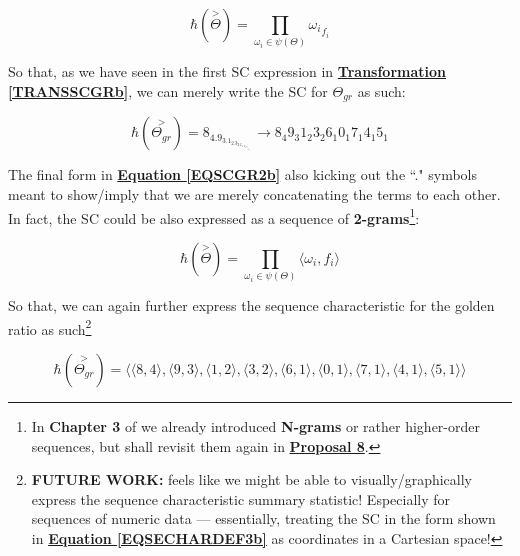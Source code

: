 \documentclass[a4paper, 18pt]{book} %
\begin{document}
\vspace{1em}
\begin{equation}
\label{EQSECHARDEF2b}
 \hbar(\overset{>}{\Theta}) = \prod\limits_{\omega_i \in \psi(\Theta)} {\omega_i}_{f_i}
\end{equation}
\vspace{1em}

So that, as we have seen in the first SC expression in  \textbf{\hyperref[TRANSSCGRb]{Transformation \ref{TRANSSCGRb}}}, we can merely write the SC for $\Theta_{gr}$ as such:

\vspace{1em}
\begin{equation}
\label{EQSCGR2b}
 \hbar(\overset{>}{\Theta_{gr}}) = 8_4.9_3.1_2.3_2.6_1.0_1.7_1.4_1.5_1 \rightarrow 8_4 9_3 1_2 3_2 6_1 0_1 7_1 4_1 5_1
\end{equation}
\vspace{1em}

The final form in \textbf{\hyperref[EQSCGR2b]{Equation \ref{EQSCGR2b}}} also kicking out the ``." symbols meant to show/imply that we are merely concatenating the terms to each other. In fact, the SC could be also expressed as a sequence of \textbf{2-grams}\footnote{In \textbf{Chapter 3} of \cite{lutalo_2025_trans_genetics} we already introduced \textbf{N-grams} or rather higher-order sequences, but shall revisit them again in \textbf{\hyperref[PROP8]{Proposal 8}}.}:

\vspace{1em}
\begin{equation}
\label{EQSECHARDEF3b}
 \hbar(\overset{>}{\Theta}) = \prod\limits_{\omega_i \in \psi(\Theta)} \langle \omega_i, f_i \rangle
\end{equation}
\vspace{1em}

So that, we can again further express the sequence characteristic for the golden ratio as such\footnote{\textbf{FUTURE WORK:} feels like we might be able to visually/graphically express the sequence characteristic summary statistic! Especially for sequences of numeric data --- essentially, treating the SC in the form shown in \textbf{\hyperref[EQSECHARDEF3b]{Equation \ref{EQSECHARDEF3b}}} as coordinates in a Cartesian space!}

\vspace{1em}
\begin{equation}
\label{EQSCGR3b}
 \hbar(\overset{>}{\Theta_{gr}}) = \langle \langle 8, 4 \rangle, \langle 9, 3 \rangle, \langle 1, 2 \rangle, \langle 3, 2 \rangle, \langle 6, 1 \rangle, \langle 0, 1 \rangle, \langle 7, 1 \rangle, \langle 4, 1 \rangle, \langle 5, 1 \rangle \rangle 
\end{equation}
\vspace{1em}
\end{document}
